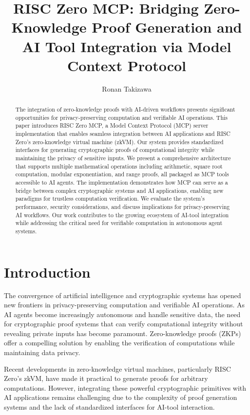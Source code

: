 \documentclass[11pt]{article}
\begin{document}
\title{RISC Zero MCP: Bridging Zero-Knowledge Proof Generation and AI Tool Integration via Model Context Protocol}

\author{Ronan Takizawa}


\maketitle

\begin{abstract}
The integration of zero-knowledge proofs with AI-driven workflows presents significant opportunities for privacy-preserving computation and verifiable AI operations. This paper introduces RISC Zero MCP, a Model Context Protocol (MCP) server implementation that enables seamless integration between AI applications and RISC Zero's zero-knowledge virtual machine (zkVM). Our system provides standardized interfaces for generating cryptographic proofs of computational integrity while maintaining the privacy of sensitive inputs. We present a comprehensive architecture that supports multiple mathematical operations including arithmetic, square root computation, modular exponentiation, and range proofs, all packaged as MCP tools accessible to AI agents. The implementation demonstrates how MCP can serve as a bridge between complex cryptographic systems and AI applications, enabling new paradigms for trustless computation verification. We evaluate the system's performance, security considerations, and discuss implications for privacy-preserving AI workflows. Our work contributes to the growing ecosystem of AI-tool integration while addressing the critical need for verifiable computation in autonomous agent systems.
\end{abstract}

\section{Introduction}

The convergence of artificial intelligence and cryptographic systems has opened new frontiers in privacy-preserving computation and verifiable AI operations. As AI agents become increasingly autonomous and handle sensitive data, the need for cryptographic proof systems that can verify computational integrity without revealing private inputs has become paramount. Zero-knowledge proofs (ZKPs) offer a compelling solution by enabling the verification of computations while maintaining data privacy.

Recent developments in zero-knowledge virtual machines, particularly RISC Zero's zkVM, have made it practical to generate proofs for arbitrary computations. However, integrating these powerful cryptographic primitives with AI applications remains challenging due to the complexity of proof generation systems and the lack of standardized interfaces for AI-tool interaction.
\end{document}
